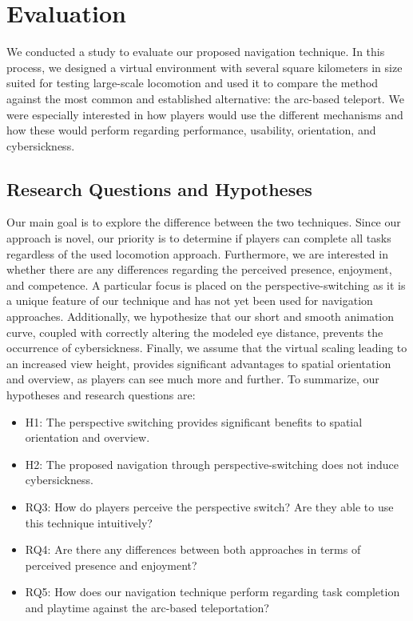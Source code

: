 \documentclass{sigchi}
\begin{document}
\section{Evaluation}
We conducted a study to evaluate our proposed navigation technique. In this process, we designed a virtual environment with several square kilometers in size suited for testing large-scale locomotion and used it to compare the method against the most common and established alternative: the arc-based teleport. We were especially interested in how players would use the different mechanisms and how these would perform regarding performance, usability, orientation, and cybersickness. 

\subsection{Research Questions and Hypotheses}
Our main goal is to explore the difference between the two techniques. Since our approach is novel, our priority is to determine if players can complete all tasks regardless of the used locomotion approach. Furthermore, we are interested in whether there are any differences regarding the perceived presence, enjoyment, and competence. A particular focus is placed on the perspective-switching as it is a unique feature of our technique and has not yet been used for navigation approaches. Additionally, we hypothesize that our short and smooth animation curve, coupled with correctly altering the modeled eye distance, prevents the occurrence of cybersickness. Finally, we assume that the virtual scaling leading to an increased view height, provides significant advantages to spatial orientation and overview, as players can see much more and further. To summarize, our hypotheses and research questions are:

\begin{itemize}
  \setlength{\itemsep}{2pt}
  \setlength{\parskip}{0pt}
  \setlength{\parsep}{0pt}

\item H1: The perspective switching provides significant benefits to spatial orientation and overview.
\item H2: The proposed navigation through perspective-switching does not induce cybersickness.
\item RQ3: How do players perceive the perspective switch? Are they able to use this technique intuitively? 
\item RQ4: Are there any differences between both approaches in terms of perceived presence and enjoyment?
\item RQ5: How does our navigation technique perform regarding task completion and playtime against the arc-based teleportation?
\end{itemize}
\end{document}
